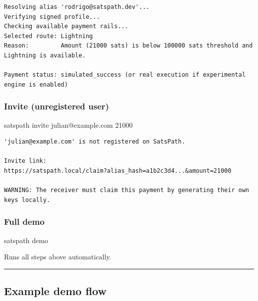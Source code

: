\documentclass[
]{article}
\newenvironment{Shaded}{}{}
\newcommand{\ExtensionTok}[1]{#1}
\newcommand{\NormalTok}[1]{#1}
\begin{document}
\begin{verbatim}
Resolving alias 'rodrigo@satspath.dev'...
Verifying signed profile...
Checking available payment rails...
Selected route: Lightning
Reason:         Amount (21000 sats) is below 100000 sats threshold and Lightning is available.

Payment status: simulated_success (or real execution if experimental engine is enabled)
\end{verbatim}

\hypertarget{invite-unregistered-user}{%
\subsubsection{Invite (unregistered
user)}\label{invite-unregistered-user}}

\begin{Shaded}
\begin{Highlighting}[]
\ExtensionTok{satspath}\NormalTok{ invite julian@example.com 21000}
\end{Highlighting}
\end{Shaded}

\begin{verbatim}
'julian@example.com' is not registered on SatsPath.

Invite link:
https://satspath.local/claim?alias_hash=a1b2c3d4...&amount=21000

WARNING: The receiver must claim this payment by generating their own keys locally.
\end{verbatim}

\hypertarget{full-demo}{%
\subsubsection{Full demo}\label{full-demo}}

\begin{Shaded}
\begin{Highlighting}[]
\ExtensionTok{satspath}\NormalTok{ demo}
\end{Highlighting}
\end{Shaded}

Runs all steps above automatically.

\begin{center}\rule{0.5\linewidth}{0.5pt}\end{center}

\hypertarget{example-demo-flow}{%
\subsection{Example demo flow}\label{example-demo-flow}}
\end{document}
